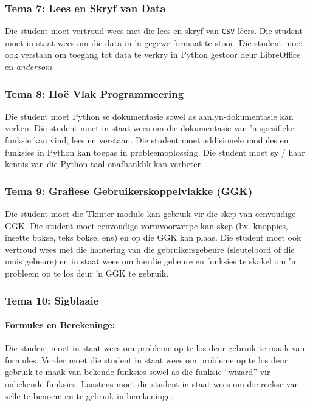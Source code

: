         \subsubsection{Tema 7: Lees en Skryf van Data}
            Die student moet vertroud wees met die lees en skryf van
            \texttt{CSV} l\^eers. Die student moet in staat wees om die data
            in 'n gegewe formaat te stoor. Die student moet ook verstaan om
            toegang tot data te verkry in Python gestoor deur LibreOffice en
            \textit{andersom}.

        \subsubsection{Tema 8: Ho\"e Vlak Programmeering}
            Die student moet Python se dokumentasie sowel as
            aanlyn-dokumentasie kan verken. Die student moet in staat wees om
            die dokumentasie van 'n spesifieke funksie kan vind, lees en
            verstaan. Die student moet addisionele modules en funksies in
            Python kan toepas in probleemoplossing. Die student moet sy / haar
            kennis van die Python taal onafhanklik kan verbeter.

        \subsubsection{Tema 9: Grafiese Gebruikerskoppelvlakke (GGK)}
            Die student moet die Tkinter module kan gebruik vir die skep van
            eenvoudige GGK. Die student moet eenvoudige vormvoorwerpe kan skep
            (bv. knoppies, insette bokse, teks bokse, ens) en op die GGK kan
            plaas. Die student moet ook vertroud wees met die hantering van die
            gebruikersgebeure (sleutelbord of die muis gebeure) en in staat
            wees om hierdie gebeure en funksies te skakel om 'n probleem op te
            los deur 'n GGK te gebruik.

        \subsubsection{Tema 10: Sigblaaie}
            \paragraph{Formules en Berekeninge:}
                Die student moet in staat wees om probleme op te los deur
                gebruik te maak van formules. Verder moet die student in staat
                wees om probleme op te los deur gebruik te maak van bekende
                funksies sowel as die funksie ``wizard'' vir onbekende
                funksies.  Laastens moet die student in staat wees om die
                reekse van selle te benoem en te gebruik in berekeninge.

